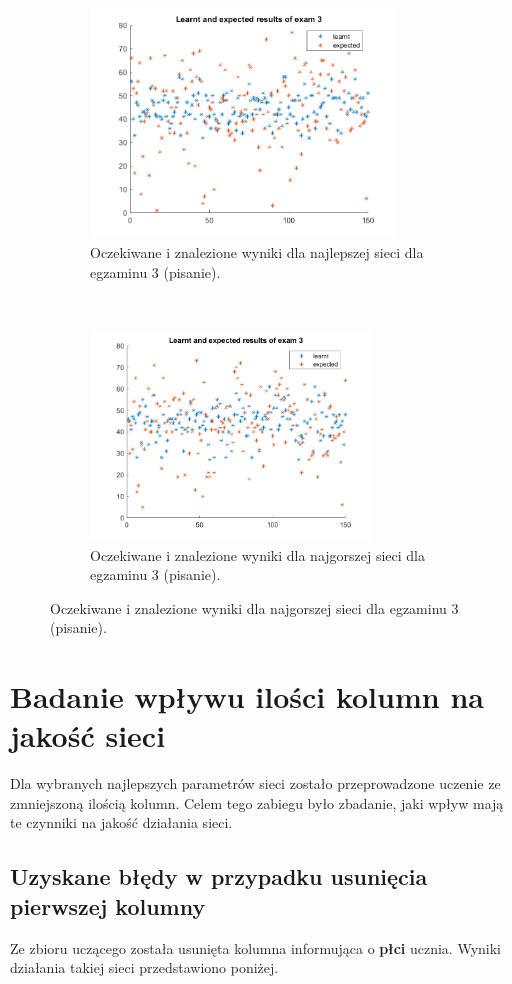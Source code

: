\documentclass[12pt]{article}
\begin{document}
\begin{figure}[H]
\begin{subfigure}[t]{0.48\textwidth} 
\centering
\includegraphics[height=2.4in]{best_results_3.png}
\caption{Oczekiwane i znalezione wyniki dla najlepszej sieci dla egzaminu 3 (pisanie).}
\end{subfigure}
~~
\begin{subfigure}[t]{0.48\textwidth} 
\centering
\includegraphics[height=2.2in]{worst_exam_3.png}
\caption{Oczekiwane i znalezione wyniki dla najgorszej sieci dla egzaminu 3 (pisanie).}
\end{subfigure}
\end{figure}



\pagebreak
\section{Badanie wpływu ilości kolumn na jakość sieci}

Dla wybranych najlepszych parametrów sieci zostało przeprowadzone uczenie ze zmniejszoną ilością kolumn. Celem tego zabiegu było zbadanie, jaki wpływ mają te czynniki na jakość działania sieci. 

\subsection{Uzyskane błędy w przypadku usunięcia pierwszej kolumny}
Ze zbioru uczącego została usunięta kolumna informująca o \textbf{płci} ucznia. Wyniki działania takiej sieci przedstawiono poniżej.
\end{document}
